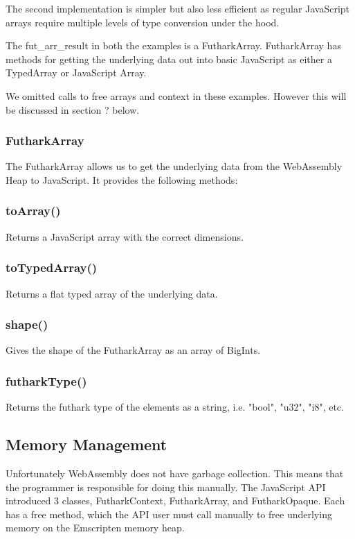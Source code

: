 \documentclass[11pt]{book}
\begin{document}
The second implementation is simpler but also less efficient as regular JavaScript arrays require multiple levels of type conversion under the hood.

The fut\_arr\_result in both the examples is a FutharkArray. FutharkArray has methods for getting the underlying data out into basic JavaScript as either a TypedArray or JavaScript Array.

We omitted calls to free arrays and context in these examples. However this will be discussed in section ? below.

\subsubsection*{FutharkArray}
The FutharkArray allows us to get the underlying data from the WebAssembly Heap to JavaScript. It provides the following methods:

\subsubsection*{toArray()}
Returns a JavaScript array with the correct dimensions.

\subsubsection*{toTypedArray()}
Returns a flat typed array of the underlying data.

\subsubsection*{shape()}
Gives the shape of the FutharkArray as an array of BigInts.

\subsubsection*{futharkType()}
Returns the futhark type of the elements as a string, i.e. "bool", "u32", "i8", etc.

\subsection{Memory Management}

Unfortunately WebAssembly does not have garbage collection. This means that the programmer is responsible for doing this manually. The JavaScript API introduced 3 classes, FutharkContext, FutharkArray, and FutharkOpaque. Each has a free method, which the API user must call manually to free underlying memory on the Emscripten memory heap. 
\end{document}
